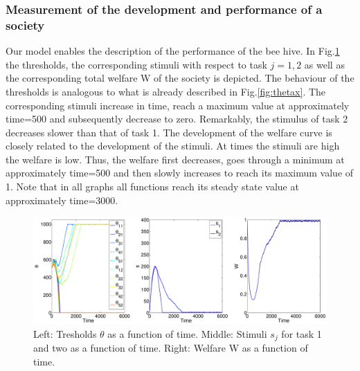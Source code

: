 \subsubsection*{Measurement of the development and performance of a society}
Our model enables the description of the performance of the bee hive. In Fig.\ref{fig:welstim} the thresholds, the corresponding stimuli with respect to task $j=1, 2$ as well as the corresponding total welfare W of the society is depicted. The behaviour of the thresholds is analogous to what is already described in Fig.\ref{fig:thetax}. The corresponding stimuli increase in time, reach a maximum value at approximately time=500 and subsequently decrease to zero. Remarkably, the stimulus of task 2 decreases slower than that of task 1. The development of the welfare curve is closely related to the development of the stimuli. At times the stimuli are high the welfare is low. Thus, the welfare first decreases, goes through a minimum at approximately time=500 and then slowly increases to reach its maximum value of 1. Note that in all graphs all functions reach its steady state value at approximately time=3000.

\begin{figure}[ht!]
	\centerline{\includegraphics[width=1.25\textwidth]{../figures/welstim.eps}}
	
	\caption{Left: Tresholds $\theta$ as a function of time. Middle: Stimuli $s_{j}$ for task 1 and two as a function of time. Right: Welfare W as a function of time.}
	\label{fig:welstim}
\end{figure}

